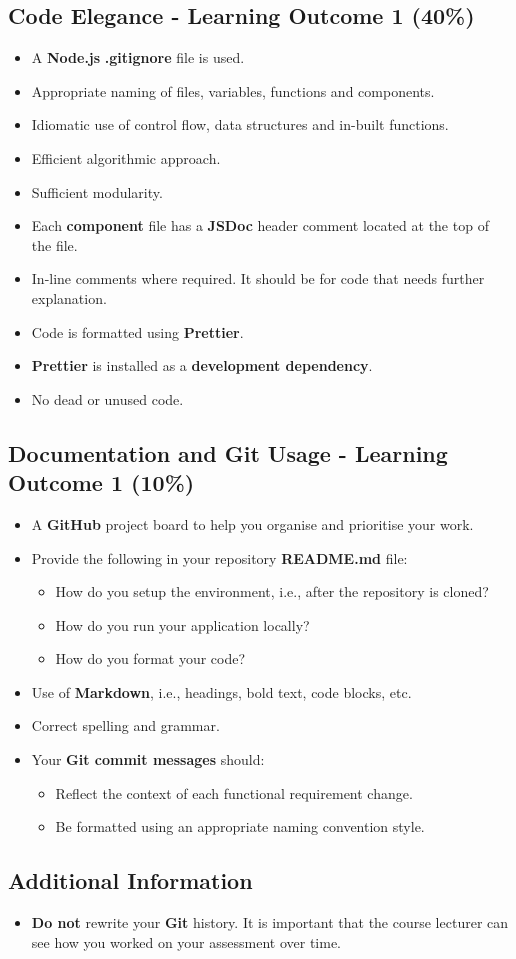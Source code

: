 \documentclass{article}
\begin{document}
\subsection*{Code Elegance - Learning Outcome 1 (40\%)}
\begin{itemize}
	\item A \textbf{Node.js} \textbf{.gitignore} file is used.
  \item Appropriate naming of files, variables, functions and components.
	\item Idiomatic use of control flow, data structures and in-built functions.
  \item Efficient algorithmic approach.
  \item Sufficient modularity.
  \item Each \textbf{component} file has a \textbf{JSDoc} header comment located at the top of the file.
\item In-line comments where required. It should be for code that needs further explanation.
  \item Code is formatted using \textbf{Prettier}.
  \item \textbf{Prettier} is installed as a \textbf{development dependency}.	
\item No dead or unused code. 
\end{itemize}

\subsection*{Documentation and Git Usage - Learning Outcome 1 (10\%)}
\begin{itemize}
	\item A \textbf{GitHub} project board to help you organise and prioritise your work. 
    \item Provide the following in your repository \textbf{README.md} file:
    \begin{itemize} 
      \item How do you setup the environment, i.e., after the repository is cloned?
	  \item How do you run your application locally?
      \item How do you format your code?
    \end{itemize}
    \item Use of \textbf{Markdown}, i.e., headings, bold text, code blocks, etc.
    \item Correct spelling and grammar.
    \item Your \textbf{Git commit messages} should:
    \begin{itemize}
      \item Reflect the context of each functional requirement change.
      \item Be formatted using an appropriate naming convention style.
    \end{itemize}	
\end{itemize}
          
\subsection*{Additional Information}
\begin{itemize}
    \item \textbf{Do not} rewrite your \textbf{Git} history. It is important that the course lecturer can see how you worked on your assessment over time. 
\end{itemize} 
\end{document}
